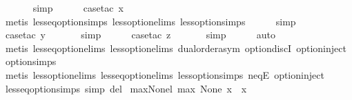 \begin{isabellebody}
\ \ \ \ \ \isamarkupfalse%
\ simp\isanewline
\ \ \ \ \isamarkupfalse%
\ {\isacharparenleft}case{\isacharunderscore}tac\ x{\isacharparenright}\isanewline
\ \ \ \ \ \isamarkupfalse%
\ {\isacharparenleft}metis\ less{\isacharunderscore}eq{\isacharunderscore}option{\isachardot}simps\ less{\isacharunderscore}option{\isachardot}elims{\isacharparenleft}{}{\isacharparenright}\ less{\isacharunderscore}option{\isachardot}simps{\isacharparenleft}{}{\isacharparenright}{\isacharparenright}\isanewline
\ \ \ \ \isamarkupfalse%
\ simp\isanewline
\ \ \ \ \isamarkupfalse%
\ {\isacharparenleft}case{\isacharunderscore}tac\ y{\isacharparenright}\isanewline
\ \ \ \ \ \isamarkupfalse%
\ simp\isanewline
\ \ \ \ \isamarkupfalse%
\ {\isacharparenleft}case{\isacharunderscore}tac\ z{\isacharparenright}\isanewline
\ \ \ \ \ \isamarkupfalse%
\ simp\isanewline
\ \ \ \ \isamarkupfalse%
\ auto{\isacharbrackleft}{}{\isacharbrackright}\isanewline
\ \ \ \isamarkupfalse%
\ {\isacharparenleft}metis\ less{\isacharunderscore}eq{\isacharunderscore}option{\isachardot}elims{\isacharparenleft}{}{\isacharparenright}\ less{\isacharunderscore}option{\isachardot}elims{\isacharparenleft}{}{\isacharparenright}\ dual{\isacharunderscore}order{\isachardot}asym\ option{\isachardot}discI\ option{\isachardot}inject\ option{\isachardot}simps{\isacharparenleft}{}{\isacharparenright}{\isacharparenright}\isanewline
\ \ \isamarkupfalse%
\ {\isacharparenleft}metis\ less{\isacharunderscore}option{\isachardot}elims{\isacharparenleft}{}{\isacharparenright}\ less{\isacharunderscore}eq{\isacharunderscore}option{\isachardot}elims{\isacharparenleft}{}{\isacharparenright}\ less{\isacharunderscore}option{\isachardot}simps{\isacharparenleft}{}{\isacharparenright}\ neqE\ option{\isachardot}inject{\isacharparenright}%
\endisatagproof
{\isafoldproof}%
%
\isadelimproof
\isanewline
%
\endisadelimproof
{}\isamarkupfalse%
\isanewline
{}\isamarkupfalse%
\ less{\isacharunderscore}eq{\isacharunderscore}option{\isachardot}simps\ {\isacharbrackleft}simp\ del{\isacharbrackright}\isanewline
\isanewline
{}\isamarkupfalse%
\ max{\isacharunderscore}None{\isacharunderscore}l{\isacharcolon}\ {\isachardoublequoteopen}max\ None\ x\ {\isacharequal}\ x{\isachardoublequoteclose}\isanewline
%
\isadelimproof

\end{isabellebody}
